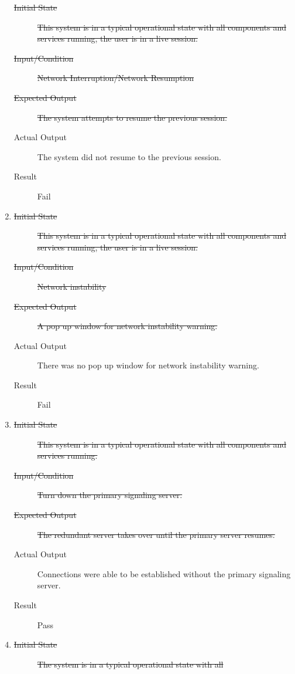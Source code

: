 \documentclass[12pt, titlepage]{article}
\begin{document}
\begin{enumerate}[NFR-T1]
    \begin{description}
    \item[\sout{Initial State}]\sout{ This system is in a typical operational state with all
      components and services running, the user is in a live session.
    }
		\item[\sout{Input/Condition}]\sout{ Network Interruption/Network Resumption
    }
		\item[\sout{Expected Output}]\sout{ The system attempts to resume the previous session.
    }
		\item[Actual Output] The system did not resume to the previous session.
    \item[Result] Fail
    \end{description}
  \item \label{NFRT8}
    \begin{description}
    \item[\sout{Initial State}]\sout{ This system is in a typical operational state with all
      components and services running, the user is in a live session.
    }
		\item[\sout{Input/Condition}]\sout{ Network instability
    }
		\item[\sout{Expected Output}]\sout{ A pop up window for network instability warning.
    }
		\item[Actual Output] There was no pop up window for network instability
      warning.
    \item[Result] Fail
    \end{description}
  \item \label{NFRT9}
    \begin{description}
    \item[\sout{Initial State}]\sout{ This system is in a typical operational state with all
      components and services running.
    }
		\item[\sout{Input/Condition}]\sout{ Turn down the primary signaling server.
    }
		\item[\sout{Expected Output}]\sout{ The redundant server takes over until the primary server
      resumes.
    }
		\item[Actual Output] Connections were able to be established without the
      primary signaling server.
    \item[Result] Pass
    \end{description}
  \item \label{NFRT10}
    \begin{description}
    \item[\sout{Initial State}]\sout{ The system is in a typical operational state with all
}
\end{description}
\end{enumerate}
\end{document}
